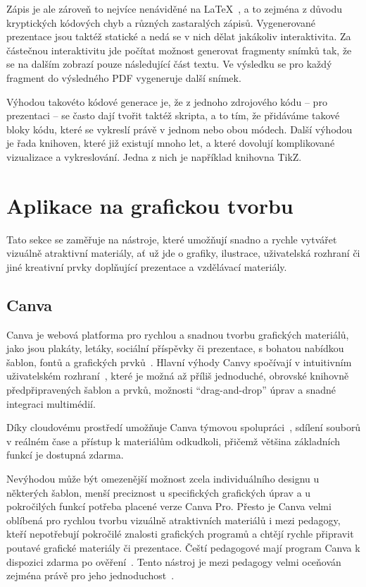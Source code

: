 Zápis je ale zároveň to nejvíce nenáviděné na \LaTeX~\cite{latex_reddit}, a to zejména z důvodu kryptických kódových chyb a různých zastaralých zápisů.
Vygenerované prezentace jsou taktéž statické a nedá se v nich dělat jakákoliv interaktivita. 
Za částečnou interaktivitu jde počítat možnost generovat fragmenty snímků tak, že se na dalším zobrazí pouze následující část textu.
Ve výsledku se pro každý fragment do výsledného PDF vygeneruje další snímek.

Výhodou takovéto kódové generace je, že z jednoho zdrojového kódu -- pro prezentaci -- se často dají tvořit taktéž skripta, a to tím, že přidáváme takové bloky kódu, které se vykreslí právě v jednom nebo obou módech.
Další výhodou je řada knihoven, které již existují mnoho let, a které dovolují komplikované vizualizace a vykreslování.
Jedna z nich je například knihovna TikZ. 

\section{Aplikace na grafickou tvorbu}\label{text:analyza/grafika}

Tato sekce se zaměřuje na nástroje, které umožňují snadno a rychle vytvářet vizuálně atraktivní materiály, ať už jde o grafiky, ilustrace, uživatelská rozhraní či jiné kreativní prvky doplňující prezentace a vzdělávací materiály.

\subsection{Canva}\label{text:canva}

Canva je webová platforma pro rychlou a snadnou tvorbu grafických materiálů, jako jsou plakáty, letáky, sociální příspěvky či prezentace, s bohatou nabídkou šablon, fontů a grafických prvků~\cite{canva_website}. 
Hlavní výhody Canvy spočívají v intuitivním uživatelském rozhraní~\cite{canva_recenze}, které je možná až příliš jednoduché, obrovské knihovně předpřipravených šablon a prvků, možnosti \enquote{drag-and-drop} úprav a snadné integraci multimédií.

Díky cloudovému prostředí umožňuje Canva týmovou spolupráci~\cite{canva_live_help, canva_live_features}, sdílení souborů v reálném čase a přístup k materiálům odkudkoli, přičemž většina základních funkcí je dostupná zdarma. 

Nevýhodou může být omezenější možnost zcela individuálního designu u některých šablon, menší preciznost u specifických grafických úprav a u pokročilých funkcí potřeba placené verze Canva Pro. 
Přesto je Canva velmi oblíbená pro rychlou tvorbu vizuálně atraktivních materiálů i mezi pedagogy, kteří nepotřebují pokročilé znalosti grafických programů a chtějí rychle připravit poutavé grafické materiály či prezentace.
Čeští pedagogové mají program Canva k dispozici zdarma po ověření~\cite{canva_education}. Tento nástroj je mezi pedagogy velmi oceňován zejména právě pro jeho jednoduchost~\cite{canva_facebook}.

